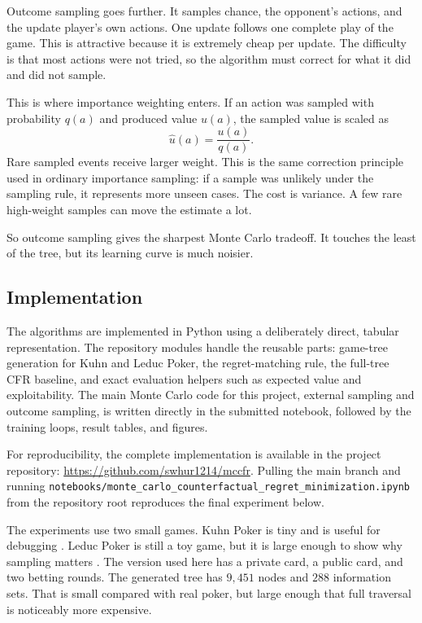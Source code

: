 \documentclass[11pt,reqno,twoside]{article}
\theoremstyle{myThm}
\theoremstyle{myRem}
\theoremstyle{myDef}
\numberwithin{equation}{section}
\begin{document}
Outcome sampling goes further. It samples chance, the opponent's actions,
and the update player's own actions. One update follows one complete play
of the game. This is attractive because it is extremely cheap per update.
The difficulty is that most actions were not tried, so the algorithm must
correct for what it did and did not sample.

This is where importance weighting enters. If an action was sampled with
probability $q(a)$ and produced value $u(a)$, the sampled value is scaled
as
\[
\widehat u(a) = \frac{u(a)}{q(a)}.
\]
Rare sampled events receive larger weight. This is the same correction
principle used in ordinary importance sampling: if a sample was unlikely
under the sampling rule, it represents more unseen cases. The cost is
variance. A few rare high-weight samples can move the estimate a lot.

So outcome sampling gives the sharpest Monte Carlo tradeoff. It touches
the least of the tree, but its learning curve is much noisier.

\subsection{Implementation}

The algorithms are implemented in Python using a deliberately direct,
tabular representation. The repository modules handle the reusable parts:
game-tree generation for Kuhn and Leduc Poker, the regret-matching rule,
the full-tree CFR baseline, and exact evaluation helpers such as expected
value and exploitability. The main Monte Carlo code for this project,
external sampling and outcome sampling, is written directly in the submitted
notebook, followed by the training loops, result tables, and figures.

For reproducibility, the complete implementation is available in the project
repository:
\url{https://github.com/swhur1214/mccfr}. Pulling the main branch and running
\texttt{notebooks/monte\_carlo\_counterfactual\_regret\_minimization.ipynb}
from the repository root reproduces the final experiment below.

The experiments use two small games. Kuhn Poker is tiny and is useful for
debugging \cite{kuhn1950,wikipediaKuhnPoker}. Leduc Poker is still a toy
game, but it is large enough to show why sampling matters
\cite{southey2005}. The version used here has a private card, a public
card, and two betting rounds. The generated tree has $9{,}451$ nodes and
$288$ information sets. That is small compared with real poker, but large
enough that full traversal is noticeably more expensive.
\end{document}
